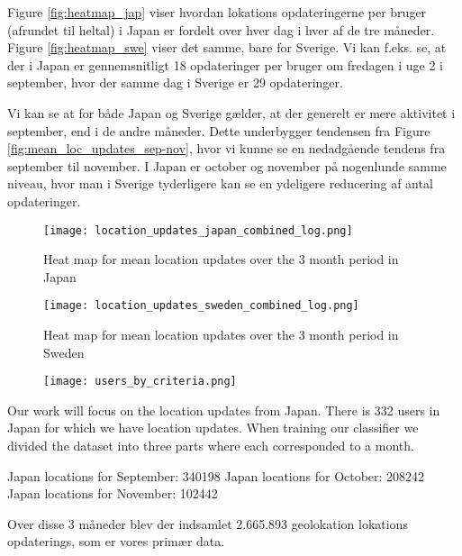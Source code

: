  Figure \ref{fig:heatmap_jap} viser hvordan lokations opdateringerne per bruger (afrundet til heltal) i Japan er fordelt over hver dag i hver af de tre måneder. Figure \ref{fig:heatmap_swe} viser det samme, bare for Sverige. 
 Vi kan f.eks. se, at der i Japan er gennemsnitligt 18 opdateringer per bruger om fredagen i uge 2 i september, hvor der samme dag i Sverige er 29 opdateringer. 

 Vi kan se at for både Japan og Sverige gælder, at der generelt er mere aktivitet i september, end i de andre måneder. Dette underbygger tendensen fra Figure \ref{fig:mean_loc_updates_sep-nov}, hvor vi kunne se en nedadgående tendens fra september til november. I Japan er october og november på nogenlunde samme niveau, hvor man i Sverige tyderligere kan se en ydeligere reducering af antal opdateringer. 

 
\newpage

\begin{figure}[H]
    \hspace*{-1.5cm}
    \centering
    \texttt{[image: location\_updates\_japan\_combined\_log.png]}
    \caption{Heat map for mean location updates over the 3 month period in Japan}
    \label{fig:heatmap_japan_combined}
\end{figure}

\begin{figure}[H]
    \hspace*{-1.5cm}
    \centering
    \texttt{[image: location\_updates\_sweden\_combined\_log.png]}
    \caption{Heat map for mean location updates over the 3 month period in Sweden}
    \label{fig:heatmap_sweden_combined}
\end{figure}

\begin{figure}[H]
    \hspace*{-1.5cm}
    \centering
    \texttt{[image: users\_by\_criteria.png]}
    \caption{}
    \label{fig:users_by_criteria}
\end{figure}

\newpage
Our work will focus on the location updates from Japan. There is 332 users in Japan for which we have location updates.
When training our classifier we divided the dataset into three parts where each corresponded to a month.

Japan locations for September: 340198
Japan locations for October: 208242
Japan locations for November: 102442


Over disse 3 måneder blev der indsamlet 2.665.893 geolokation lokations opdaterings, som er vores primær data. 


